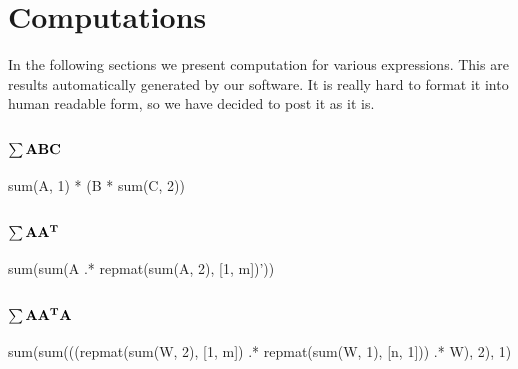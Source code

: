 \documentclass{article}
\begin{document}
 



\section{Computations}

In the following sections we present computation for various expressions.
This are results automatically generated by our software.
It is really hard to format it into human readable form, so we have decided
to post it as it is.

\subsection{{$\bf \sum ABC$}}
sum(A, 1) * (B * sum(C, 2))

\subsection{{$\bf \sum AA^T$}}
sum(sum(A .* repmat(sum(A, 2), [1, m])'))

\subsection{{$\bf \sum AA^TA$}}
sum(sum(((repmat(sum(W, 2), [1, m]) .* repmat(sum(W, 1), [n, 1])) .* W), 2), 1) 
\end{document}
